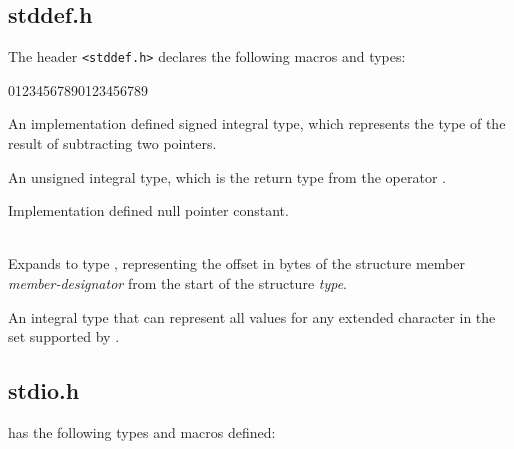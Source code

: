 \subsection{stddef.h}
\label{sec:stddefh}

The header \verb+<stddef.h>+ declares the following macros and types:


\begin{Ventry2}{01234567890123456789 }

\item[ptrdiff\_t] 
\label{item:ptrdifft}
	An implementation defined signed integral type, which
	represents the type of the result of subtracting two pointers.

\item[size\_t] 
\label{item:sizet}
	An unsigned integral type, which is the return type
	from the operator .

\item[NULL] 
\label{item:NULL}
	Implementation defined null pointer constant.

\item[offsetof]  
\label{item:offsetof}

	 \\
	Expands to type , representing the offset in bytes
	of the structure member {\it member-designator} from the start
	of the structure {\it type}.

\item[\underline{wchar\_t}]  
\index{}
\label{item:}
	An integral type that can represent all values for any extended character
	in the set supported by .

\end{Ventry2}



\subsection{stdio.h}
\label{sec:stdioh}

 has the following types and macros defined:

